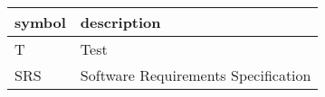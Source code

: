 \documentclass[12pt, titlepage]{article}
\begin{document}
\renewcommand{\arraystretch}{1.2}
\begin{tabular}{l p{10cm}} 
  \toprule		
  \textbf{symbol} & \textbf{description}\\
  \midrule 
  T & Test\\
  SRS & Software Requirements Specification \\


  \bottomrule
\end{tabular}\\



\newpage

\end{document}
